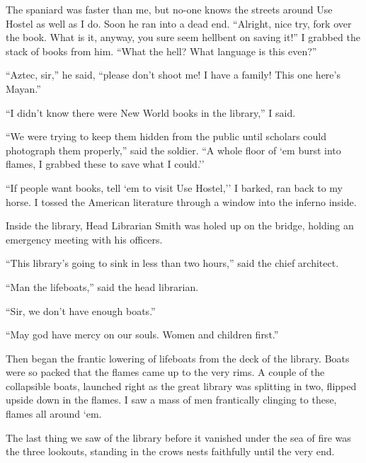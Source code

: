 \documentclass[oneside]{book}
\begin{document}
The spaniard was faster than me, but no-one knows the streets around Use Hostel as well as I do.  Soon he ran into
a dead end.  ``Alright, nice try, fork over the book.  What is it, anyway, you sure seem hellbent on saving it!''
I grabbed the stack of books from him.  ``What the hell?  What language is this even?''

``Aztec, sir,'' he said, ``please don't shoot me!  I have a family!  This one here's Mayan.''

``I didn't know there were New World books in the library,'' I said.

``We were trying to keep them hidden from the public until scholars could photograph them properly,'' said the
soldier.  ``A whole floor of `em burst into flames, I grabbed these to save what I could.''

``If people want books, tell `em to visit Use Hostel,'' I barked, ran back to my horse.  I tossed the American
literature through a window into the inferno inside.

Inside the library, Head Librarian Smith was holed up on the bridge, holding an emergency meeting with his officers.

``This library's going to sink in less than two hours,'' said the chief architect.

``Man the lifeboats,'' said the head librarian.

``Sir, we don't have enough boats.''

``May god have mercy on our souls.  Women and children first.''

Then began the frantic lowering of lifeboats from the deck of the library.  Boats were so packed that the flames
came up to the very rims.  A couple of the collapsible boats, launched right as the great library was splitting in
two, flipped upside down in the flames.  I saw a mass of men frantically clinging to these, flames all around `em.

The last thing we saw of the library before it vanished under the sea of fire was the three lookouts, standing in
the crows nests faithfully until the very end.




\end{document}
